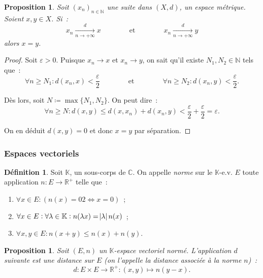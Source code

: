 \documentclass{report}
\newtheorem{prp}[thm]{Proposition}
\theoremstyle{definition}
\newtheorem{déf}[thm]{Définition}
\theoremstyle{remark}
\numberwithin{equation}{section}
\newcommand{\K}{\mathbb K}
\newcommand{\C}{\mathbb C}
\newcommand{\R}{\mathbb R}
\newcommand{\Rp}{\R^{+}}
\newcommand{\N}{\mathbb N}
\newcommand{\seq}[3]{\left(#1_{#2}\right)_{#2 \in #3}}
\newcommand{\mconv}[3]{\xrightarrow[#1 \to #2]{#3}}
\newcommand{\pinfty}{{+\infty}}
\newcommand{\evn}{espace vectoriel normé}
\begin{document}
				\begin{prp} Soit $\seq xn\N$ une suite dans $(X, d)$, un espace métrique. Soient $x, y \in X$. Si~:
				\[x_n \mconv n\pinfty d x \qquad\qquad \text{et} \qquad\qquad x_n \mconv n\pinfty d y\]
				alors $x = y$. \end{prp}

				\begin{proof} Soit $\varepsilon > 0$. Puisque $x_n \to x$ et $x_n \to y$, on sait qu'il existe $N_1, N_2 \in \N$ tels que~:
				\[\forall n \geq N_1 : d(x_n, x) < \frac \varepsilon2 \qquad\qquad \text{et} \qquad\qquad \forall n \geq N_2 : d(x_n, y) < \frac \varepsilon2.\]

				Dès lors, soit $N \coloneqq \max\{N_1, N_2\}$. On peut dire~:
				\begin{equation}
					\forall n \geq N : d(x, y) \leq d(x, x_n) + d(x_n, y) < \frac \varepsilon2 + \frac \varepsilon2 = \varepsilon.
				\end{equation}

				On en déduit $d(x, y) = 0$ et donc $x = y$ par séparation. \end{proof}

			\subsubsection{Espaces vectoriels}
				\begin{déf} Soit $\K$, un sous-corps de $\C$. On appelle \textit{norme} sur le $\K$-e.v. $E$ toute application $n : E \to \Rp$ telle que~:

				\begin{enumerate}
					\item $\forall x \in E : \left(n(x) = 02 \iff x = 0\right)$~;
					\item $\forall x \in E : \forall \lambda \in \K : n(\lambda x) = \abs \lambda n(x)$~;
					\item $\forall x, y \in E : n(x + y) \leq n(x) + n(y)$.
				\end{enumerate}
				\end{déf}

				\begin{prp} Soit $(E, n)$ un $\K$-\evn. L'application $d$ suivante est une distance sur $E$ (on l'appelle la
				\textit{distance associée à la norme $n$})~:
				\begin{equation}
					d : E \times E \to \Rp : (x, y) \mapsto n(y-x).
				\end{equation}
				\end{prp}
\end{document}

